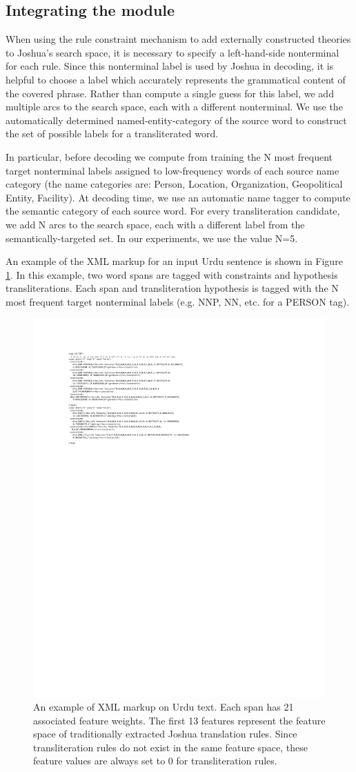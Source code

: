 \documentclass[logo]{pbml}
\begin{document}
\subsection{Integrating the module}
When using the rule constraint mechanism to add externally constructed theories to Joshua's search space, it is necessary to specify a left-hand-side nonterminal for each rule. Since this nonterminal label is used by Joshua in decoding, it is helpful to choose a label which accurately represents the grammatical content of the covered phrase. Rather than compute a single guess for this label, we add multiple arcs to the search space, each with a different nonterminal. We use the automatically determined named-entity-category of the source word to construct the set of possible labels for a transliterated word.

In particular, before decoding we compute from training the N most frequent target nonterminal labels assigned to low-frequency words of each source name category (the name categories are: Person, Location, Organization, Geopolitical Entity, Facility). At decoding time, we use an automatic name tagger to compute the semantic category of each source word. For every transliteration candidate, we add N arcs to the search space, each with a different label from the semantically-targeted set. In our experiments, we use the value N=5.

An example of the XML markup for an input Urdu sentence is shown in Figure \ref{example-urdu-xml}. In this example, two word spans are tagged with constraints and hypothesis transliterations. Each span and transliteration hypothesis is tagged with the N most frequent target nonterminal labels (e.g. NNP, NN, etc. for a PERSON tag).

\begin{figure}[t]
\begin{center}
\includegraphics[height=3.5 in]{SampleSentence.pdf}
\end{center}
\caption{An example of XML markup on Urdu text.
Each span has 21 associated feature weights. The first 13 features represent the feature space of traditionally extracted Joshua translation rules. Since transliteration rules do not exist in the same feature space, these feature values are always set to 0 for transliteration rules.}
\label{example-urdu-xml}
\end{figure}
\end{document}
